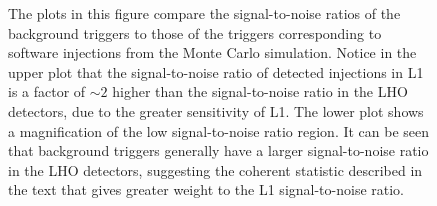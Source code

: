 \begin{figure}[p]
{\label{f:bkg_inj}%
The plots in this figure compare the signal-to-noise ratios of the background
triggers to those of the triggers corresponding to software injections from the
Monte Carlo simulation. Notice in the upper plot that the signal-to-noise
ratio of detected injections in L1 is a factor of $\sim 2$ higher than the
signal-to-noise ratio in the LHO detectors, due to the greater sensitivity of
L1. The lower plot shows a magnification of the low signal-to-noise ratio
region. It can be seen that background triggers generally have a larger
signal-to-noise ratio in the LHO detectors, suggesting the coherent statistic
described in the text that gives greater weight to the L1 signal-to-noise
ratio.
}
\end{figure}




